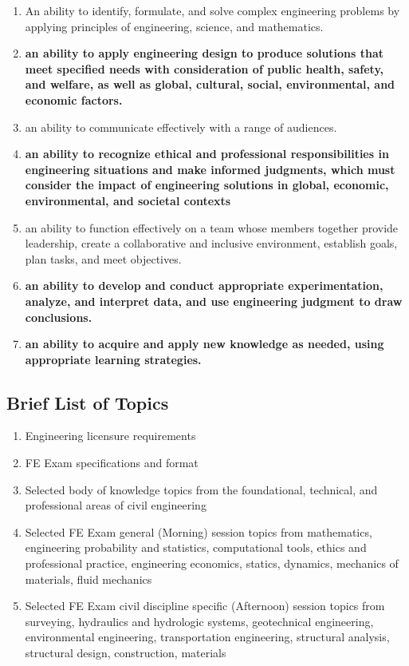 \documentclass[12pt]{article}
\begin{document}
\begin{enumerate}
\item An ability to identify, formulate, and solve complex engineering problems by applying
principles of engineering, science, and mathematics.
\item \textbf{an ability to apply engineering design to produce solutions that meet specified needs
with consideration of public health, safety, and welfare, as well as global, cultural, social,
environmental, and economic factors.}
\item an ability to communicate effectively with a range of audiences.
\item \textbf{an ability to recognize ethical and professional responsibilities in engineering
situations and make informed judgments, which must consider the impact of
engineering solutions in global, economic, environmental, and societal contexts}
\item an ability to function effectively on a team whose members together provide leadership,
create a collaborative and inclusive environment, establish goals, plan tasks, and meet
objectives.
\item \textbf{an ability to develop and conduct appropriate experimentation, analyze, and interpret
data, and use engineering judgment to draw conclusions.}
\item \textbf{an ability to acquire and apply new knowledge as needed, using appropriate learning
strategies.}
\end{enumerate}

\subsection*{{Brief List of Topics}}
\begin{enumerate}
\item Engineering licensure requirements
\item FE Exam specifications and format
\item Selected body of knowledge topics from the foundational, technical, and
professional areas of civil engineering
\item Selected FE Exam general (Morning) session topics from mathematics, engineering
probability and statistics, computational tools, ethics and professional practice,
engineering economics, statics, dynamics, mechanics of materials, fluid mechanics
\item Selected FE Exam civil discipline specific (Afternoon) session topics from
surveying, hydraulics and hydrologic systems, geotechnical engineering,
environmental engineering, transportation engineering, structural analysis,
structural design, construction, materials
\end{enumerate}
\end{document}
